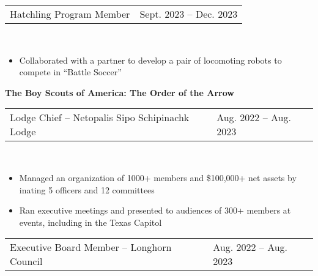 \documentclass[18pt]{article}
\begin{document}
    \vspace{-0.5\baselineskip}

    \begin{tabular}{p{} p{} }
        Hatchling Program Member
        &\hfill Sept. 2023 – Dec. 2023
    \end{tabular}\\

    \vspace{-0.75\baselineskip}
    \begin{itemize}[noitemsep]
        \vspace{-\baselineskip}
        
        \item Collaborated with a partner to develop a pair of locomoting robots to compete in “Battle Soccer” 
        \vspace{-0.75\baselineskip}
    \end{itemize}


    \textbf{The Boy Scouts of America: The Order of the Arrow }\\

    \vspace{-\baselineskip}
    \begin{tabular}{p{} p{} }
        Lodge Chief – Netopalis Sipo Schipinachk Lodge
        &\hfill Aug. 2022 – Aug. 2023
    \end{tabular}\\

    \vspace{-0.75\baselineskip}
    \begin{itemize}[noitemsep]
        \vspace{-\baselineskip}
        \item Managed an organization of 1000+ members and \$100,000+ net assets by inating 5 officers and 12 committees
        \item Ran executive meetings and presented to audiences of 300+ members at events, including in the Texas Capitol 
        \vspace{-0.5\baselineskip}
    \end{itemize}


    \begin{tabular}{p{} p{} }
        Executive Board Member – Longhorn Council
        &\hfill Aug. 2022 – Aug. 2023
    \end{tabular}\\
\end{document}
